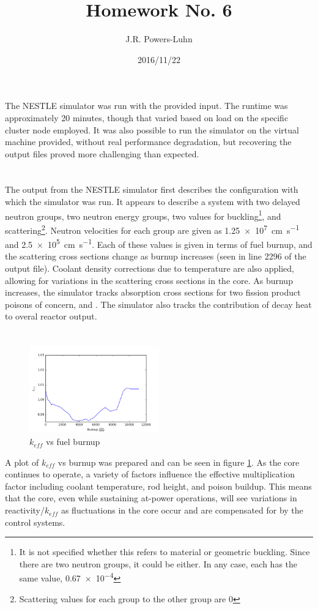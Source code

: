\documentclass{hw}
\author{J.R. Powers-Luhn}
\date{2016/11/22}
\title{Homework No. 6}
\begin{document}
\section{}
The NESTLE simulator was run with the provided input. The runtime was approximately 20 minutes, though that varied based on load on the specific cluster node employed. It was also possible to run the simulator on the virtual machine provided, without real performance degradation, but recovering the output files proved more challenging than expected.

\section{}
The output from the NESTLE simulator first describes the configuration with which the simulator was run. It appears to describe a system with two delayed neutron groups, two neutron energy groups, two values for buckling\footnote{It is not specified whether this refers to material or geometric buckling. Since there are two neutron groups, it could be either. In any case, each has the same value, \num{0.67e-4}}, and scattering\footnote{Scattering values for each group to the other group are \num{0}}. Neutron velocities for each group are given as \SI{1.25e7}{\centi\meter\per\second} and \SI{2.5e5}{\centi\meter\per\second}. Each of these values is given in terms of fuel burnup, and the scattering cross sections change as burnup increases (seen in line 2296 of the output file). Coolant density corrections due to temperature are also applied, allowing for variations in the scattering cross sections in the core. As burnup increases, the simulator tracks absorption cross sections for two fission product poisons of concern,  and . The simulator also tracks the contribution of decay heat to overal reactor output.

\section{}
\begin{figure}
    \centering
    \includegraphics[width=0.5\textwidth]{k_eff_normal}
    \caption{$k_{eff}$ vs fuel burnup}    
    \label{fig:k_eff_normal}
\end{figure}
A plot of $k_{eff}$ vs burnup was prepared and can be seen in figure \ref{fig:k_eff_normal}. As the core continues to operate, a variety of factors influence the effective multiplication factor including coolant temperature, rod height, and poison buildup. This means that the core, even while sustaining at-power operations, will see variations in reactivity/$k_{eff}$ as fluctuations in the core occur and are compensated for by the control systems.
\end{document}

